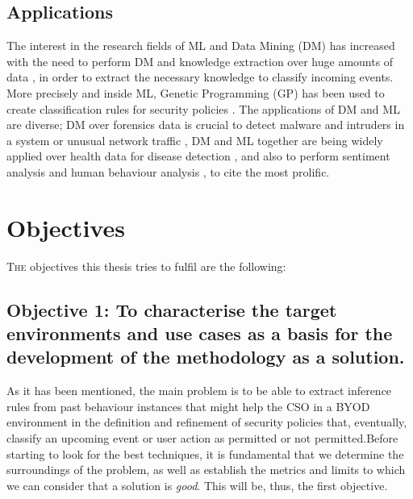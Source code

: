 \subsection{Applications}
\label{subsec:apps}

The interest in the research fields of ML and Data Mining (DM) has increased with the need to perform DM and knowledge extraction over huge amounts of data \cite{witten2016data}, in order to extract the necessary knowledge to classify incoming events. More precisely and inside ML, Genetic Programming (GP) has been used to create classification rules for security policies \cite{freitas2002data, DeFalco2002257, sec_policy_evolution_gp_08, pol_evol_gp_3_approaches_08}. The applications of DM and ML are diverse; DM over forensics data is crucial to detect malware \cite{Ma:2011:LDM:1961189.1961202, DeVel2001} and intruders in a system \cite{Jaswal2015} or unusual network traffic \cite{Shalaginov2017359}, DM and ML together are being widely applied over health data for disease detection \cite{Murdoch20131351}, and also to perform sentiment analysis \cite{Poria201445, Ravi201514} and human behaviour analysis \cite{Kosinski20135802}, to cite the most prolific.

\section{Objectives}                     
\label{sec:intro:objs}

\lettrine{T}{he} objectives this thesis tries to fulfil are the following:

\newcommand{\objectivescenarios}{To characterise the target environments and use cases as a basis for the development of the methodology as a solution.} 

\subsection*{Objective 1: \objectivescenarios}
\label{subsec:intro:obj:problems}

As it has been mentioned, the main problem is to be able to extract inference rules from past behaviour instances that might help the CSO in a BYOD environment in the definition and refinement of security policies that, eventually, classify an upcoming event or user action as permitted or not permitted.Before starting to look for the best techniques, it is fundamental that we determine the surroundings of the problem, as well as establish the metrics and limits to which we can consider that a solution is \textit{good}. This will be, thus, the first objective. 

